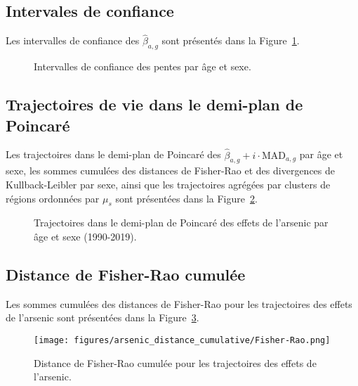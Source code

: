 \subsection{Intervales de confiance}
Les intervalles de confiance des \(\hat{\beta}_{a,g}\) sont présentés dans la Figure~\ref{fig:CI-arsenic}.
\begin{figure}[H]
	\centering
	\caption{Intervalles de confiance des pentes par âge et sexe.}
	\label{fig:CI-arsenic}
\end{figure}

\subsection{Trajectoires de vie dans le demi-plan de Poincaré}
Les trajectoires dans le demi-plan de Poincaré des \(\hat{\beta}_{a,g} + i \cdot \mathrm{MAD}_{a,g}\) par âge et sexe, les sommes cumulées des distances de Fisher-Rao et des divergences de Kullback-Leibler par sexe, ainsi que les trajectoires agrégées par clusters de régions ordonnées par \(\mu_s\) sont présentées dans la Figure~\ref{fig:trajectoires-arsenic}.
\begin{figure}[H]
	\centering
	\caption{Trajectoires dans le demi-plan de Poincaré des effets de l'arsenic par âge et sexe (1990-2019).}
	\label{fig:trajectoires-arsenic}
\end{figure}

\subsection{Distance de Fisher-Rao cumulée}
Les sommes cumulées des distances de Fisher-Rao pour les trajectoires des effets de l'arsenic sont présentées dans la Figure~\ref{fig:arsenic_distance_cumulative-Fisher-Rao}.
\begin{figure}[H]
	\centering
	\texttt{[image: figures/arsenic\_distance\_cumulative/Fisher-Rao.png]}
	\caption{Distance de Fisher-Rao cumulée pour les trajectoires des effets de l'arsenic.}
	\label{fig:arsenic_distance_cumulative-Fisher-Rao}
\end{figure}


